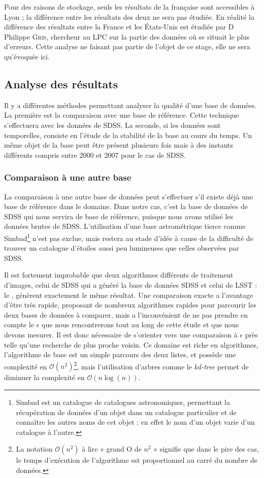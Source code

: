 Pour des raisons de stockage, seuls les résultats de la \DC{} française sont accessibles à Lyon ; la différence entre les résultats des deux \DC{} ne sera pas étudiée. En réalité la différence des résultats entre la France et les États-Unis est étudiée par D Philippe \textsc{Gris}, chercheur au LPC sur la partie des données où se situait le plus d'erreurs. Cette analyse ne faisant pas partie de l'objet de ce stage, elle ne sera qu'évoquée ici.

	\subsection{Analyse des résultats}

Il y a différentes méthodes permettant analyser la qualité d'une base de données. La première est la comparaison avec une base de référence. Cette technique s'effectuera avec les données de SDSS. La seconde, si les données sont temporelles, consiste en l'étude de la stabilité de la base au cours du temps. Un même objet de la base peut être présent plusieurs fois mais à des instants différents compris entre 2000 et 2007 pour le cas de SDSS.

		\subsubsection{Comparaison à une autre base}
La comparaison à une autre base de données peut s'effectuer s'il existe déjà une base de référence dans le domaine. Dans notre cas, c'est la base de données de SDSS qui nous servira de base de référence, puisque nous avons utilisé les données brutes de SDSS. L'utilisation d'une base astrométrique tierce comme Simbad\footnote{Simbad est un catalogue de catalogues astronomiques, permettant la récupération de données d'un objet dans un catalogue particulier et de connaître les autres noms de cet objet ; en effet le nom d'un objet varie d'un catalogue à l'autre.} n'est pas exclue, mais restera au stade d'idée à cause de la difficulté de trouver un catalogue d'étoiles aussi peu lumineuses que celles observées par SDSS.

Il est fortement improbable que deux algorithmes différents de traitement d'images, celui de SDSS qui a généré la base de données SDSS et celui de LSST : le \stack, génèrent exactement le même résultat. Une comparaison exacte a l'avantage d'être très rapide, proposant de nombreux algorithmes rapides pour parcourir les deux bases de données à comparer, mais a l'inconvénient de ne pas prendre en compte le $\epsilon$ que nous rencontrerons tout au long de cette étude et que nous devons mesurer. Il est donc nécessaire de s'orienter vers une comparaison à $\epsilon$ près telle qu'une recherche de plus proche voisin. Ce domaine est riche en algorithmes, l'algorithme de base est un simple parcours des deux listes, et possède une complexité en $\mathcal{O}(n^2)$\footnote{La notation $\mathcal{O}(n^2)$ à lire « grand O de $n^2$ » signifie que dans le pire des cas, le temps d'exécution de l'algorithme est proportionnel au carré du nombre de données.}, mais l'utilisation d'arbres comme le \emph{kd-tree} permet de diminuer la complexité en $\mathcal{O}(n\log(n))$.

